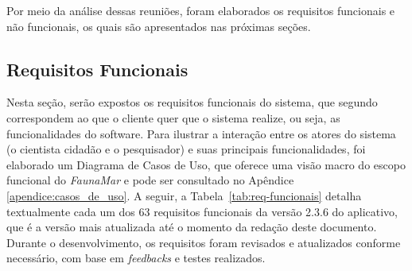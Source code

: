 Por meio da análise dessas reuniões, foram elaborados os requisitos funcionais e não funcionais, os quais são apresentados nas próximas seções.

\subsection{Requisitos Funcionais}

Nesta seção, serão expostos os requisitos funcionais do sistema, que segundo  correspondem ao que o cliente quer que o sistema realize, ou seja, as funcionalidades do software. Para ilustrar a interação entre os atores do sistema (o cientista cidadão e o pesquisador) e suas principais funcionalidades, foi elaborado um Diagrama de Casos de Uso, que oferece uma visão macro do escopo funcional do \textit{FaunaMar} e pode ser consultado no Apêndice \ref{apendice:casos_de_uso}. A seguir, a Tabela~\ref{tab:req-funcionais} detalha textualmente cada um dos 63 requisitos funcionais da versão 2.3.6 do aplicativo, que é a versão mais atualizada até o momento da redação deste documento. Durante o desenvolvimento, os requisitos foram revisados e atualizados conforme necessário, com base em \textit{feedbacks} e testes realizados.

